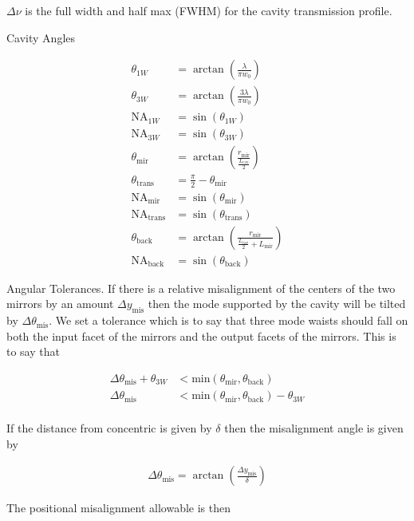 \documentclass[12pt]{article}
\begin{document}
$\Delta\nu$ is the full width and half max (FWHM) for the cavity transmission profile.

Cavity Angles

\begin{align}
\theta_{1W} &= \arctan\left(\frac{\lambda}{\pi w_0}\right)\\
\theta_{3W} &= \arctan\left(\frac{3 \lambda}{\pi w_0}\right)\\
\text{NA}_{1W} &= \sin(\theta_{1W})\\
\text{NA}_{3W} &= \sin(\theta_{3W})\\
\theta_{\text{mir}} &= \arctan\left(\frac{r_{\text{mir}}}{\frac{L_{\text{cav}}}{2}}\right)\\
\theta_{\text{trans}} &= \frac{\pi}{2} - \theta_{\text{mir}}\\
\text{NA}_{\text{mir}} &= \sin(\theta_{\text{mir}})\\
\text{NA}_{\text{trans}} &= \sin(\theta_{\text{trans}})\\
\theta_{\text{back}} &= \arctan\left(\frac{r_{\text{mir}}}{\frac{L_{\text{cav}}}{2} + L_{\text{mir}}} \right)\\
\text{NA}_{\text{back}} &= \sin(\theta_{\text{back}})
\end{align}

Angular Tolerances. If there is a relative misalignment of the centers of the two mirrors by an amount $\Delta y_{\text{mis}}$ then the mode supported by the cavity will be tilted by $\Delta \theta_{\text{mis}}$. We set a tolerance which is to say that three mode waists should fall on both the input facet of the mirrors and the output facets of the mirrors. This is to say that

\begin{align}
\Delta\theta_{\text{mis}} + \theta_{3W} &< \text{min}(\theta_{\text{mir}}, \theta_{\text{back}})\\
\Delta\theta_{\text{mis}}  &< \text{min}(\theta_{\text{mir}}, \theta_{\text{back}}) - \theta_{3W}\\
\end{align}

If the distance from concentric is given by $\delta$ then the misalignment angle is given by

\begin{align}
\Delta\theta_{\text{mis}} = \arctan\left(\frac{\Delta y_{\text{mis}}}{\delta}\right)
\end{align}

The positional misalignment allowable is then
\end{document}
